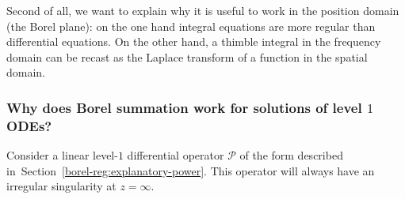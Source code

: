 \documentclass{article}
\theoremstyle{definition}
\theoremstyle{plain}
\begin{document}
Second of all, we want to explain why it is useful to work in the position domain (the Borel plane): on the one hand integral equations are more regular than differential equations. On the other hand, a thimble integral in the frequency domain can be recast as the Laplace transform of a function in the spatial domain. 
\subsubsection{Why does Borel summation work for solutions of level $1$ ODEs?}\label{sec:why_borel_ODE}
%
Consider a linear level-$1$ differential operator $\mathcal{P}$ of the form described in~Section~\ref{borel-reg:explanatory-power}. This operator will always have an irregular singularity at $z = \infty$.
\end{document}
